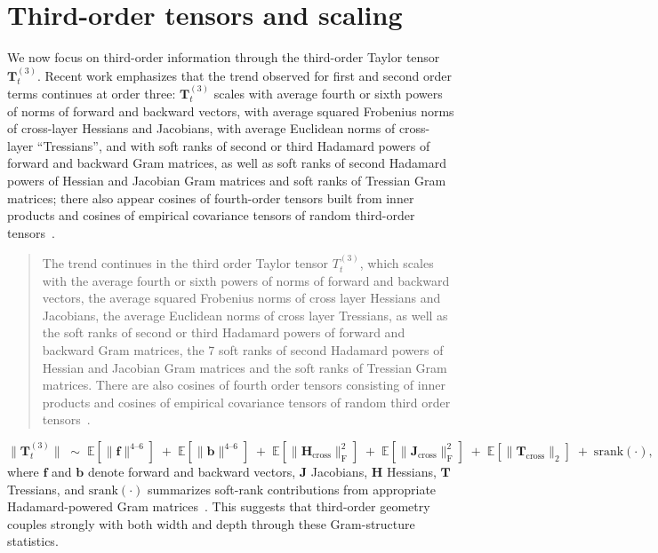 \documentclass[12pt]{article}
\begin{document}
\section{Third-order tensors and scaling}\label{sec:third}
We now focus on third-order information through the third-order Taylor tensor \(\bm{T}^{(3)}_{t}\). Recent work emphasizes that the trend observed for first and second order terms continues at order three: \(\bm{T}^{(3)}_{t}\) scales with average fourth or sixth powers of norms of forward and backward vectors, with average squared Frobenius norms of cross-layer Hessians and Jacobians, with average Euclidean norms of cross-layer ``Tressians'', and with soft ranks of second or third Hadamard powers of forward and backward Gram matrices, as well as soft ranks of second Hadamard powers of Hessian and Jacobian Gram matrices and soft ranks of Tressian Gram matrices; there also appear cosines of fourth-order tensors built from inner products and cosines of empirical covariance tensors of random third-order tensors~\cite{terjek2025featurelearningedgestability}.
\begin{quote}
\small
The trend continues in the third order Taylor tensor $T^{(3)}_{t}$, which scales with the average fourth or sixth powers of norms of forward and backward vectors, the average squared Frobenius norms of cross layer Hessians and Jacobians, the average Euclidean norms of cross layer Tressians, as well as the soft ranks of second or third Hadamard powers of forward and backward Gram matrices, the 7 soft ranks of second Hadamard powers of Hessian and Jacobian Gram matrices and the soft ranks of Tressian Gram matrices. There are also cosines of fourth order tensors consisting of inner products and cosines of empirical covariance tensors of random third order tensors~\cite{terjek2025featurelearningedgestability}.
\end{quote}
\begin{equation}\label{eq:third-order-scaling}
\|\bm{T}^{(3)}_{t}\| \;\sim\; \mathbb{E}\!\left[\|\bm{f}\|^{4\text{--}6}\right] \;+\; \mathbb{E}\!\left[\|\bm{b}\|^{4\text{--}6}\right] \;+\; \mathbb{E}\!\left[\|\bm{H}_{\text{cross}}\|_{\mathrm{F}}^{2}\right] \;+\; \mathbb{E}\!\left[\|\bm{J}_{\text{cross}}\|_{\mathrm{F}}^{2}\right] \;+\; \mathbb{E}\!\left[\|\bm{T}_{\text{cross}}\|_{2}\right] \;+\; \mathrm{srank}(\cdot),
\end{equation}
where \(\bm{f}\) and \(\bm{b}\) denote forward and backward vectors, \(\bm{J}\) Jacobians, \(\bm{H}\) Hessians, \(\bm{T}\) Tressians, and \(\mathrm{srank}(\cdot)\) summarizes soft-rank contributions from appropriate Hadamard-powered Gram matrices~\cite{terjek2025featurelearningedgestability}. This suggests that third-order geometry couples strongly with both width and depth through these Gram-structure statistics.
\end{document}
